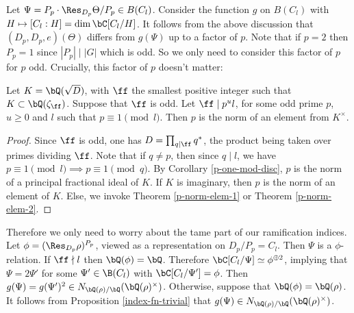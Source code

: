 Let $\Psi = P_p \cdot \Res_{D_p}\Theta / P_p \in B(C_l)$.
Consider the function $g$ on $B(C_l)$ with $H \mapsto [C_l : H] = \dim \bC[C_l / H]$. 
It follows from the above discussion that $(D_p, D_p, e)(\Theta)$ differs from $g(\Psi)$ up to a factor of $p$. Note that if $p = 2$ then $P_p = 1$ since $|P_p| \mid |G|$ which is odd. So we only need to consider this factor of $p$ for $p$ odd.
Crucially, this factor of $p$ doesn't matter:

\begin{lemma}\label{p-norm-odd}
    Let $K = \bQ(\sqrt{D})$, with $\ff$ the smallest positive integer such that $K \subset \bQ(\zeta_{\ff})$. Suppose that $\ff$ is odd. Let $\ff \mid p^u l $, for some odd prime $p$, $u \geq 0$ and $l$ such that $p \equiv 1 \pmod l$. Then $p$ is the norm of an element from $K^{\times}$.
\end{lemma}

\begin{proof}
    Since $\ff$ is odd, one has $D = \prod_{q | \ff} q^*$, the product being taken over primes dividing $\ff$. Note that if $q \not= p$, then since $q \mid l$, we have $p \equiv 1 \pmod l \implies p \equiv 1 \pmod q$. By Corollary \ref{p-one-mod-disc},  $p$ is the norm of a principal fractional ideal of $K$. If $K$ is imaginary, then $p$ is the norm of an element of $K$. Else, we invoke Theorem \ref{p-norm-elem-1} or Theorem \ref{p-norm-elem-2}.
\end{proof}

Therefore we only need to worry about the tame part of our ramification indices. Let $\phi = (\Res_{D_p} \rho)^{P_p}$, viewed as a representation on $D_p / P_p = C_l$. Then $\Psi$ is a $\phi$-relation. If $\ff \nmid l$ then $\bQ(\phi) = \bQ$. Therefore $\bC[C_l / \Psi] \simeq \phi^{\oplus 2}$, implying that $\Psi = 2\Psi'$ for some $\Psi' \in \B(C_l)$ with $\bC[C_l / \Psi'] = \phi$. Then $g(\Psi) = g(\Psi')^2 \in \fieldnorm{\rho}$. Otherwise, suppose that $\bQ(\phi) = \bQ(\rho)$. It follows from Proposition \ref{index-fn-trivial} that $g(\Psi) \in \fieldnorm{\rho}$.


